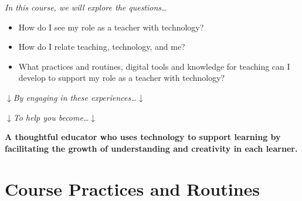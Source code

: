 \documentclass{tufte-handout}
\begin{document}
\begin{center}
	\large\textit{In this course, we will explore the questions\ldots}
\end{center}
\begin{framed}
	\small
	\begin{itemize}
		\item How do I see my role as a teacher with technology?
		\item How do I relate teaching, technology, and me?
		\item What practices and routines, digital tools and knowledge for teaching can I develop to support my role as a teacher with technology?
	\end{itemize}
\end{framed}
\begin{center}
	\large$\downarrow$\hspace{0.5em}\textit{By engaging in these experiences\ldots}\hspace{0.5em}$\downarrow$
\end{center}
\begin{center}
	\large$\downarrow$\hspace{0.5em}\textit{To help you become\ldots}\hspace{0.5em}$\downarrow$
\end{center}

\begin{framed}
	\begin{center}
		\small\noindent\textbf{A thoughtful educator who uses technology to support learning by facilitating the growth of understanding and creativity in each learner.}
	\end{center}
\end{framed}

\normalsize

\newpage

\part{Course Practices and Routines}
\end{document}
